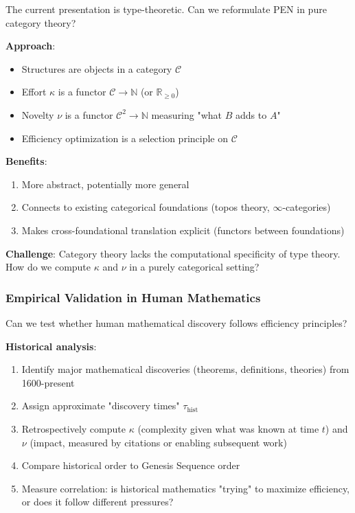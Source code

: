 \documentclass[11pt]{article}
\theoremstyle{definition}
\begin{document}
The current presentation is type-theoretic. Can we reformulate PEN in pure category theory?

\textbf{Approach}:
\begin{itemize}
\item Structures are objects in a category $\mathcal{C}$
\item Effort $\kappa$ is a functor $\mathcal{C} \to \mathbb{N}$ (or $\mathbb{R}_{\geq 0}$)
\item Novelty $\nu$ is a functor $\mathcal{C}^2 \to \mathbb{N}$ measuring "what $B$ adds to $A$"
\item Efficiency optimization is a selection principle on $\mathcal{C}$
\end{itemize}

\textbf{Benefits}:
\begin{enumerate}
\item More abstract, potentially more general
\item Connects to existing categorical foundations (topos theory, $\infty$-categories)
\item Makes cross-foundational translation explicit (functors between foundations)
\end{enumerate}

\textbf{Challenge}: Category theory lacks the computational specificity of type theory. How do we compute $\kappa$ and $\nu$ in a purely categorical setting?

\subsubsection{Empirical Validation in Human Mathematics}

Can we test whether human mathematical discovery follows efficiency principles?

\textbf{Historical analysis}:
\begin{enumerate}
\item Identify major mathematical discoveries (theorems, definitions, theories) from 1600-present
\item Assign approximate "discovery times" $\tau_{\text{hist}}$
\item Retrospectively compute $\kappa$ (complexity given what was known at time $t$) and $\nu$ (impact, measured by citations or enabling subsequent work)
\item Compare historical order to Genesis Sequence order
\item Measure correlation: is historical mathematics "trying" to maximize efficiency, or does it follow different pressures?
\end{enumerate}
\end{document}
